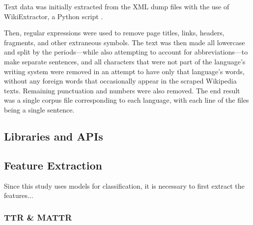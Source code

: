 \documentclass[12pt,a4paper]{article}
\numberwithin{figure}{section}
\numberwithin{table}{section}
\numberwithin{definition}{section}
\begin{document}
Text data was initially extracted from the XML dump files with the use of WikiExtractor, a Python script \parencite{Attardi2015wikiextractor}.

Then, regular expressions were used to remove page titles, links, headers, fragments, and other extraneous symbols. The text was then made all lowercase and split by the periods---while also attempting to account for abbreviations---to make separate sentences, and all characters that were not part of the language's writing system were removed in an attempt to have only that language's words, without any foreign words that occasionally appear in the scraped Wikipedia texts. Remaining punctuation and numbers were also removed. The end result was a single corpus file corresponding to each language, with each line of the files being a single sentence. 

\subsection{Libraries and APIs}
\label{ssec:librariesandapis}


\subsection{Feature Extraction}
\label{ssec:featureextraction}



Since this study uses models for classification, it is necessary to first extract the features...

\subsubsection{TTR \& MATTR}
\label{ssec:ttrandmattr}
\end{document}
